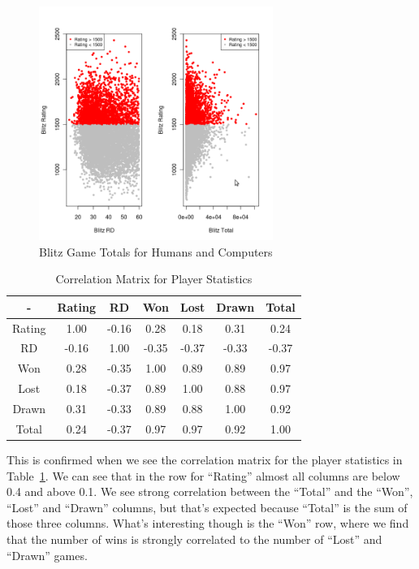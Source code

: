 \documentclass{article}
\begin{document}
\begin{figure} [htp]
\begin{center}
\includegraphics[width=3in]{ratings_rd_total.png}
\end{center}
\caption{Blitz Game Totals for Humans and Computers}
\label{fig:ratingsrdtotal}
\end{figure}

\begin{table}[htp]
\begin{center}
\begin{tabular}{|c|c|c|c|c|c|c|}
\hline

- & Rating & RD & Won & Lost & Drawn & Total \\
\hline
Rating & 1.00 & -0.16 & 0.28 & 0.18 & 0.31 & 0.24\\
\hline
RD & -0.16 & 1.00 & -0.35 & -0.37 & -0.33 & -0.37\\
\hline
Won & 0.28 & -0.35 & 1.00 & 0.89 & 0.89 & 0.97\\
\hline
Lost & 0.18 & -0.37 & 0.89 & 1.00 & 0.88 & 0.97\\
\hline
Drawn & 0.31 & -0.33 & 0.89 & 0.88 & 1.00 & 0.92\\
\hline
Total & 0.24 & -0.37 & 0.97 & 0.97 & 0.92 & 1.00\\
\hline
\end{tabular}
\end{center}
\caption{Correlation Matrix for Player Statistics}
\label{tab:playercor}
\end{table}



This is confirmed when we see the correlation matrix for the player statistics in Table~\ref{tab:playercor}. We can see that in the row for ``Rating'' almost all columns are below 0.4 and above 0.1. We see strong correlation between the ``Total'' and the ``Won'', ``Lost'' and ``Drawn'' columns, but that's expected because ``Total'' is the sum of those three columns. What's interesting though is the ``Won'' row, where we find that the number of wins is strongly correlated to the number of ``Lost'' and ``Drawn'' games. \\
\end{document}
